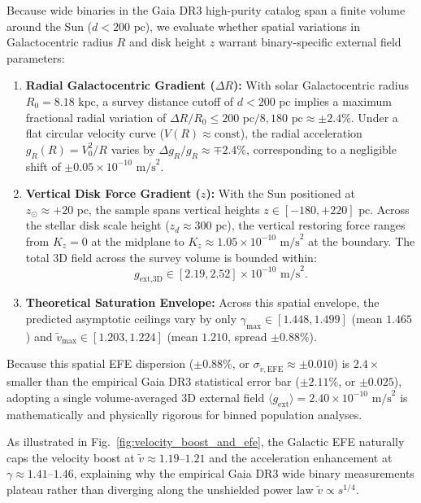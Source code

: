 \documentclass[aps,prd,reprint,superscriptaddress,nofootinbib,floatfix,amsmath,amssymb]{revtex4-2}
\begin{document}
Because wide binaries in the Gaia DR3 high-purity catalog span a finite volume around the Sun ($d < 200\text{ pc}$), we evaluate whether spatial variations in Galactocentric radius $R$ and disk height $z$ warrant binary-specific external field parameters:
\begin{enumerate}
\item \textbf{Radial Galactocentric Gradient ($\Delta R$):} With solar Galactocentric radius $R_0 = 8.18\text{ kpc}$, a survey distance cutoff of $d < 200\text{ pc}$ implies a maximum fractional radial variation of $\Delta R / R_0 \le 200\text{ pc} / 8,180\text{ pc} \approx \pm 2.4\%$. Under a flat circular velocity curve ($V(R) \approx \text{const}$), the radial acceleration $g_R(R) = V_0^2 / R$ varies by $\Delta g_R / g_R \approx \mp 2.4\%$, corresponding to a negligible shift of $\pm 0.05 \times 10^{-10}\text{ m/s}^2$.
\item \textbf{Vertical Disk Force Gradient ($z$):} With the Sun positioned at $z_\odot \approx +20\text{ pc}$, the sample spans vertical heights $z \in [-180, +220]\text{ pc}$. Across the stellar disk scale height ($z_d \approx 300\text{ pc}$), the vertical restoring force ranges from $K_z = 0$ at the midplane to $K_z \approx 1.05 \times 10^{-10}\text{ m/s}^2$ at the boundary. The total 3D field across the survey volume is bounded within:
\begin{equation}
g_{\text{ext,3D}} \in [2.19, 2.52] \times 10^{-10}\text{ m/s}^2.
\end{equation}
\item \textbf{Theoretical Saturation Envelope:} Across this spatial envelope, the predicted asymptotic ceilings vary by only $\gamma_{\text{max}} \in [1.448, 1.499]$ (mean $1.465$) and $\tilde{v}_{\text{max}} \in [1.203, 1.224]$ (mean $1.210$, spread $\pm 0.88\%$).
\end{enumerate}
Because this spatial EFE dispersion ($\pm 0.88\%$, or $\sigma_{\tilde{v},\text{EFE}} \approx \pm 0.010$) is $2.4\times$ smaller than the empirical Gaia DR3 statistical error bar ($\pm 2.11\%$, or $\pm 0.025$), adopting a single volume-averaged 3D external field $\langle g_{\text{ext}} \rangle = 2.40 \times 10^{-10}\text{ m/s}^2$ is mathematically and physically rigorous for binned population analyses.

As illustrated in Fig.~\ref{fig:velocity_boost_and_efe}, the Galactic EFE naturally caps the velocity boost at $\tilde{v} \approx 1.19\text{--}1.21$ and the acceleration enhancement at $\gamma \approx 1.41\text{--}1.46$, explaining why the empirical Gaia DR3 wide binary measurements plateau rather than diverging along the unshielded power law $\tilde{v} \propto s^{1/4}$.
\end{document}
